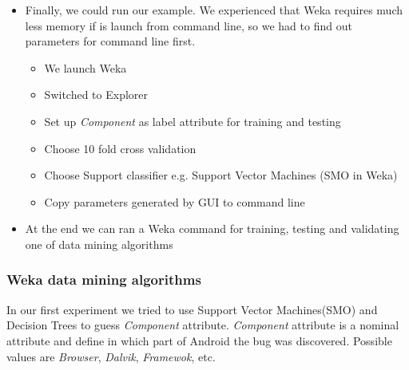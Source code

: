 \begin{itemize}
    \item Finally, we could run our example. We experienced that Weka requires much less memory if is launch from command line, so we had to find out parameters for command line first.
        \begin{itemize}
            \item We launch Weka
            \item Switched to Explorer
            \item Set up {\it Component} as label attribute for training and testing
            \item Choose 10 fold cross validation
            \item Choose Support classifier e.g. Support Vector Machines (SMO in Weka)
            \item Copy parameters generated by GUI to command line
        \end{itemize}
    \item At the end we can ran a Weka command for training, testing and validating one of data mining algorithms 
\end{itemize}

\subsubsection*{Weka data mining algorithms} %
\label{ssub:Weka datamining algorithms}

In our first experiment we tried to use Support Vector Machines(SMO) and Decision Trees to guess {\it Component} attribute.  {\it Component} attribute is a nominal attribute and define in which part of Android the bug was discovered. Possible values are {\it Browser}, {\it Dalvik}, {\it Framewok}, etc.

